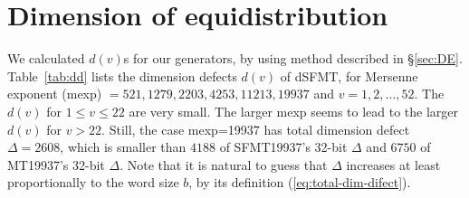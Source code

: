 \documentclass{svmult}
\begin{document}
\section{Dimension of equidistribution}
\label{sec:equidistribution}
We calculated $d(v)$s for our generators, by using method described 
in \S\ref{sec:DE}.
Table~\ref{tab:dd} lists the dimension defects $d(v)$ of dSFMT, for
Mersenne exponent (mexp) $= 521, 1279, 2203, 4253, 11213, 19937$ and
$v=1,2,\ldots, 52$.  The $d(v)$ for $1 \le v \le 22$ are very small. 
The larger mexp
seems to lead to the larger $d(v)$ for $v>22$. Still, the case mexp=19937 has 
total dimension defect $\Delta=2608$, which is smaller than $4188$ of
SFMT19937's 32-bit $\Delta$ and $6750$ of MT19937's 32-bit $\Delta$.
Note that it is natural to guess that 
$\Delta$ increases at least proportionally to the word size $b$,
by its definition (\ref{eq:total-dim-difect}).
\end{document}
